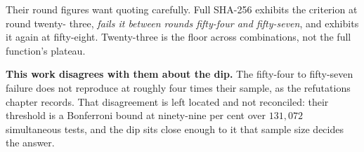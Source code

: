 Their round figures want quoting carefully. Full SHA-256 exhibits the criterion at round twenty-
three, \emph{fails it between rounds fifty-four and fifty-seven}, and exhibits it again at
fifty-eight. Twenty-three is the floor across combinations, not the full function's plateau.

\textbf{This work disagrees with them about the dip.} The fifty-four to fifty-seven failure does not
reproduce at roughly four times their sample, as the refutations chapter records. That disagreement
is left located and not reconciled: their threshold is a Bonferroni bound at ninety-nine per cent
over \(131{,}072\) simultaneous tests, and the dip sits close enough to it that sample size decides
the answer.
